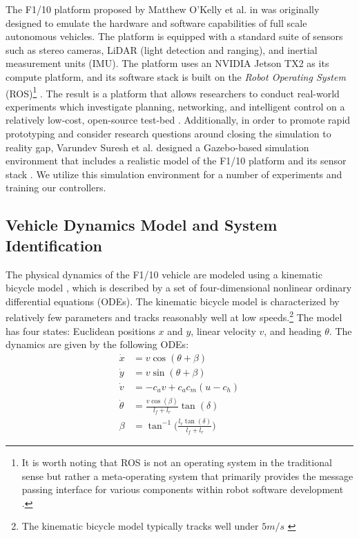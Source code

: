 \documentclass[manuscript,screen,review]{acmart}
\newcommand{\todo}[1]{\textcolor{red}{\textbf{\underline{TODO:}} #1}}
\begin{document}
The F1/10 platform proposed by Matthew O'Kelly et al. in \cite{F1102019} was originally designed to emulate the hardware and software capabilities of full scale autonomous vehicles. The platform is equipped with a standard suite of sensors such as stereo cameras, LiDAR (light detection and ranging), and inertial measurement units (IMU). The platform uses an NVIDIA Jetson TX2 as its compute platform, and its software stack is built on the \emph{Robot Operating System} (ROS)\footnote{It is worth noting that ROS is not an operating system in the traditional sense but rather a meta-operating system that primarily provides the message passing interface for various components within robot software development \cite{Huang2014}.} \cite{ROS}. The result is a platform that allows researchers to conduct real-world experiments which investigate planning, networking, and intelligent control on a relatively low-cost, open-source test-bed \cite{F1102019}. Additionally, in order to promote rapid prototyping and consider research questions around closing the simulation to reality gap\cite{Muratore2019}, Varundev Suresh et al. designed a Gazebo-based simulation environment \cite{Gazebo} that includes a realistic model of the F1/10 platform and its sensor stack \cite{varundev_ros_19}. We utilize this simulation environment for a number of experiments and training our controllers.


\subsection{Vehicle Dynamics Model and System Identification}



The physical dynamics of the F1/10 vehicle are modeled using a kinematic bicycle model \cite{Rajamani2012}, which is described by a set of four-dimensional nonlinear ordinary differential equations (ODEs). The kinematic bicycle model is characterized by relatively few parameters and tracks reasonably well at low speeds.\footnote{ The kinematic bicycle model typically tracks well under $5 m/s$ \cite{ivanov2020case}} The model has four states: Euclidean positions $x$ and $y$, linear velocity $v$, and heading $\theta$. The dynamics are given by the following ODEs: 
\begin{align*}
    \Dot{x} & = v\cos(\theta +\beta)\\
    \Dot{y} & = v\sin(\theta + \beta)\\
    \Dot{v} & = -c_av +c_ac_m(u-c_h)\\
    \Dot{\theta} & = \frac{v\cos(\beta)}{l_f+l_r}\tan(\delta)\\
    \beta &= \tan^{-1}\Big(\frac{l_r\tan(\delta)}{l_f+l_r}\Big)
\end{align*}
\end{document}
